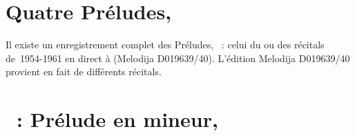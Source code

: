 \begin{workitemize}
\begin{perfitemize}
 \end{perfitemize}
 \item{}
 \begin{perfitemize}
  \item\NoEdition{}
 \end{perfitemize}
 \item{}
 \begin{perfitemize}
  \item{}
 \end{perfitemize}
\end{workitemize}

\section*{%
Quatre Préludes, }

Il existe un enregistrement complet des Préludes, ~: celui du ou
des récitals de~1954-1961 en direct à \MSHM (Melodija D019639/40).
L'édition Melodija D019639/40 provient en fait de différents récitals.

\section{\ifChrono \Scriabine{}~: \fi
Prélude en \kB \Flat mineur,  }
\label{\thesection}

